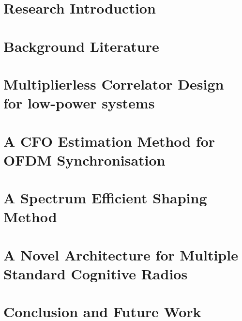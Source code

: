 \chapter{Research Introduction}
\label{chap:introduction}
%
\chapter{Background Literature}
\label{chap:BackgroundLiterature}
%
\chapter{Multiplierless Correlator Design for low-power systems}
\label{chap:multiplierlesscorrelator}



%
\chapter{A CFO Estimation Method for OFDM Synchronisation}
\label{chap:CFO}
%
\chapter{A Spectrum Efficient Shaping Method}
\label{chap:SpectralLeakage}
%
\chapter{A Novel Architecture for Multiple Standard Cognitive Radios}
\label{chap:MSCR}
%
\chapter{Conclusion and Future Work}
\label{chap:conclusion}



\appendix
%

\newpage
{}








